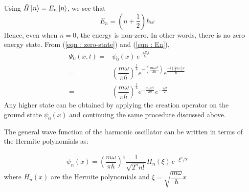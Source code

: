 \documentclass[12pt,a4paper,answers]{exam}
\begin{document}
\begin{questions}
\begin{solutionorbox}
		Using $ \hat{H} \ket{n} = E_n \ket{n} $, we see that 
		\begin{equation}\label{eqn : En}
			\boxed{E_n =  \left( n + \dfrac{1}{2} \right) \hbar \omega}
		\end{equation}
		Hence, even when $ n=0 $, the energy is non-zero. In other words, there is no zero energy state.
		From (\ref{eqn : zero-state}) and (\ref{eqn : En}),
		\begin{eqnarray}
			\Psi_0 (x,t) =& \psi_{0}(x)\ e^{\frac{-iE_0 t}{\hbar}} \nonumber\\
			=&	\left( \dfrac{m\omega}{\pi\hbar} \right)^{\frac{1}{4}} e^{-\left(\frac{m\omega x^2}{2\hbar}\right)} e^{\frac{-i\left(\frac{1}{2}\hbar\omega\right)t}{\hbar}} \nonumber \\
			=&	\left( \dfrac{m\omega}{\pi\hbar} \right)^{\frac{1}{4}} e^{-\frac{m\omega x^2}{2\hbar}} e^{-\frac{i\omega t}{2}}
		\end{eqnarray}
		Any higher state can be obtained by applying the creation operator on the ground state $ \psi_{0} (x) $ and continuing the same procedure discussed above.
		
		The general wave function of the harmonic oscillator can be written in terms of the Hermite polynomials as:
		
		\begin{equation}
			\psi_{n} (x) = 	\left( \dfrac{m\omega}{\pi\hbar} \right)^{\frac{1}{4}} \dfrac{1}{\sqrt{2^n n!}} H_n (\xi)\,e^{-\xi^2 / 2}
		\end{equation}
		where $ H_n(x) $ are the Hermite polynomials and $ \xi = \sqrt{\dfrac{m\omega}{\hbar}} x $
	\end{solutionorbox}
\end{questions}
	
\end{document}

